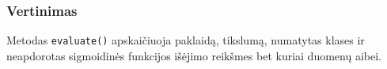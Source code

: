\subsubsection{Vertinimas}
\label{subsubsec:vertinimas}

Metodas \texttt{evaluate()} apskaičiuoja paklaidą, tikslumą, numatytas klases ir neapdorotas sigmoidinės funkcijos išėjimo reikšmes bet kuriai duomenų aibei.